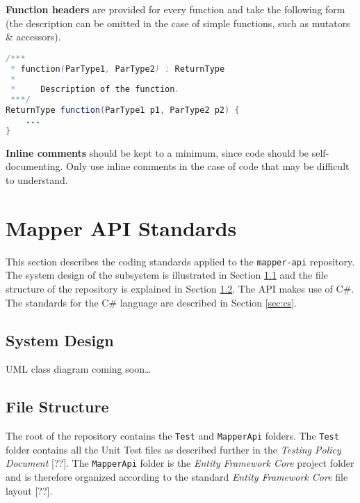 \documentclass{article}
\begin{document}
    \textbf{Function headers} are provided for every function and take the
    following form (the description can be omitted in the case of simple
    functions, such as mutators \& accessors).

    \begin{lstlisting}[language=Java]
/***
 * function(ParType1, ParType2) : ReturnType
 *
 *     Description of the function.
 ***/
ReturnType function(ParType1 p1, ParType2 p2) {
    ...
}
    \end{lstlisting}

    \textbf{Inline comments} should be kept to a minimum, since code should be
    self-documenting. Only use inline comments in the case of code that may be
    difficult to understand.

    \newpage


    \section{Mapper API Standards}
    \label{sec:mapper-api}

    This section describes the coding standards applied to the
    \texttt{mapper-api} repository. The system design of the subsystem is
    illustrated in Section \ref{sec:api-design} and the file structure of the
    repository is explained in Section \ref{sec:api-struc}. The API makes use of
    C\#. The standards for the C\# language are described in Section
    \ref{sec:cs}.

    \subsection{System Design}
    \label{sec:api-design}

    UML class diagram coming soon\ldots

    \subsection{File Structure}
    \label{sec:api-struc}

    The root of the repository contains the \texttt{Test} and \texttt{MapperApi}
    folders. The \texttt{Test} folder contains all the Unit Test files as
    described further in the \textit{Testing Policy Document} [??]. The
    \texttt{MapperApi} folder is the \textit{Entity Framework Core} project
    folder and is therefore organized according to the standard \textit{Entity
    Framework Core} file layout [??].
\end{document}
